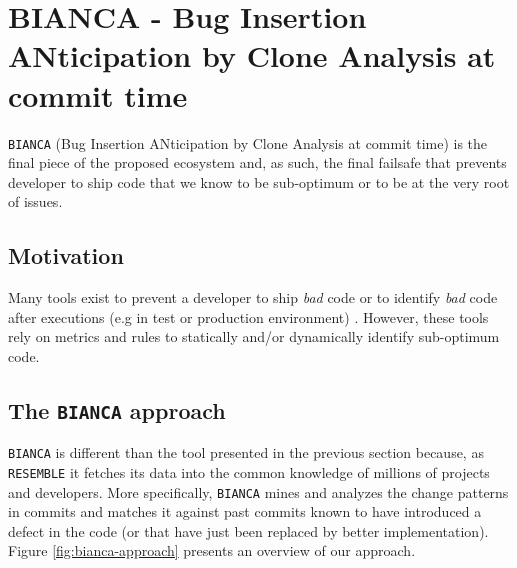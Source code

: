 
\section{BIANCA - Bug Insertion ANticipation by Clone Analysis at commit time\label{sec:BIANCA}}

{\tt BIANCA} (Bug Insertion ANticipation by Clone Analysis at commit time) is the final piece of the proposed ecosystem and, as such, the final failsafe that prevents developer to ship code that we know to be sub-optimum or to be at the very root of issues.

\subsection{Motivation\label{sec:bianca-motivation}}

Many tools exist to prevent a developer to ship {\it bad} code \cite{Dangel2000,Hovemeyer2007,Moha2010} or to identify {\it bad} code after executions (e.g in test or production environment) \cite{Nayrolles,Nayrolles2013a}.
However, these tools rely on metrics and rules to statically and/or dynamically identify sub-optimum code.

\subsection{The {\tt BIANCA} approach\label{sec:bianca-approach}}

{\tt BIANCA} is different than the tool presented in the previous section  because, as {\tt RESEMBLE} it fetches its data into the common knowledge of millions of projects and developers.
More specifically, {\tt BIANCA} mines and analyzes the change patterns in commits and matches it against past commits known to have introduced a defect in the code (or that have just been replaced by better implementation). Figure \ref{fig:bianca-approach} presents an overview of our approach.

